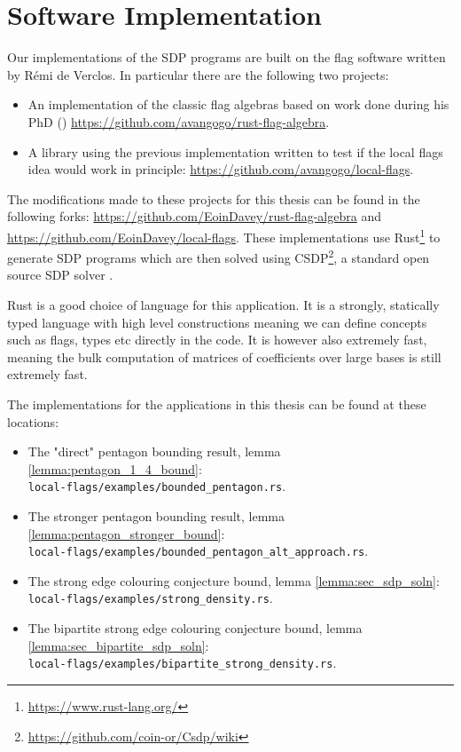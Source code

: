 \chapter{Software Implementation}
\label{app:flag_software}

Our implementations of the SDP programs are built on the flag software written by
Rémi de Verclos. In particular there are the following two projects:
\begin{itemize}
    \item An implementation of the classic flag algebras based on work done during his
        PhD (\cite{deverclosApplicationsLimitsCombinatorial2016})
        \url{https://github.com/avangogo/rust-flag-algebra}.
    \item A library using the previous implementation written to test if the local flags idea
        would work in principle: \url{https://github.com/avangogo/local-flags}.
\end{itemize}

The modifications made to these projects for this thesis can be found in the following forks:
\url{https://github.com/EoinDavey/rust-flag-algebra} and\\
\url{https://github.com/EoinDavey/local-flags}.
These implementations use Rust\footnote{\url{https://www.rust-lang.org/}} to generate SDP programs which are
then solved using CSDP\footnote{\url{https://github.com/coin-or/Csdp/wiki}},
a standard open source SDP solver
\cite{borchersCSDPLibrarySemidefinite1999}.

\begin{note*}
    Rust is a good choice of language for this application. It is a strongly, statically typed
    language with high level constructions meaning we can define concepts such as flags, types
    etc directly in the code. It is however also extremely fast, meaning the bulk computation
    of matrices of coefficients over large bases is still extremely fast.
\end{note*}

The implementations for the applications in this thesis can be found at these locations:
\begin{itemize}
    \item The "direct" pentagon bounding result, lemma
        \ref{lemma:pentagon_1_4_bound}:\\
        \verb|local-flags/examples/bounded_pentagon.rs|.
    \item The stronger pentagon bounding result, lemma
        \ref{lemma:pentagon_stronger_bound}:\\
        \verb|local-flags/examples/bounded_pentagon_alt_approach.rs|.
    \item The strong edge colouring conjecture bound, lemma
        \ref{lemma:sec_sdp_soln}:\\
        \verb|local-flags/examples/strong_density.rs|.
    \item The bipartite strong edge colouring conjecture bound, lemma
        \ref{lemma:sec_bipartite_sdp_soln}:\\
        \verb|local-flags/examples/bipartite_strong_density.rs|.
\end{itemize}


